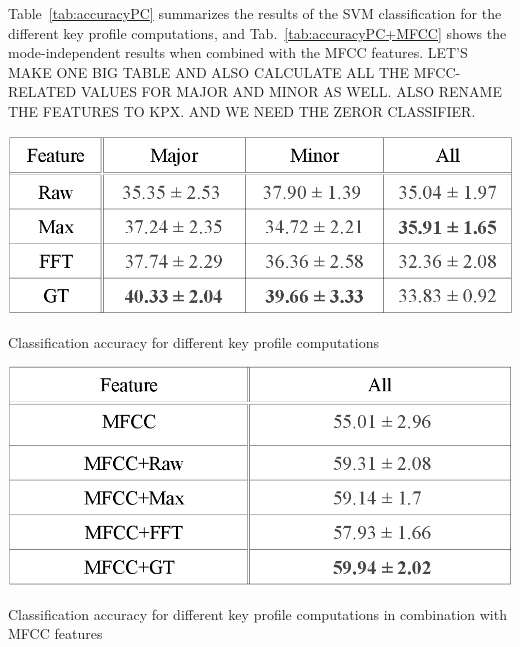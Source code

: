 \documentclass{article}
\begin{document}
Table~\ref{tab:accuracyPC} summarizes the results of the SVM classification for the different key profile computations, and Tab.~\ref{tab:accuracyPC+MFCC} shows the mode-independent results when combined with the MFCC features. LET'S MAKE ONE BIG TABLE AND ALSO CALCULATE ALL THE MFCC-RELATED VALUES FOR MAJOR AND MINOR AS WELL. ALSO RENAME THE FEATURES TO KPX. AND WE NEED THE ZEROR CLASSIFIER.
\begin{table}[tb]
    \includegraphics[scale=.4]{graph/accuracyPC}
	\caption{Classification accuracy for different key profile computations}
	\label{tab:accuracyPC}
\end{table}
\begin{table}[tb]
    \includegraphics[scale=.4]{graph/accuracyPC+MFCC}
	\caption{Classification accuracy for different key profile computations in combination with MFCC features}
	\label{tab:accuracyPC+MFCC}
\end{table}
\end{document}

